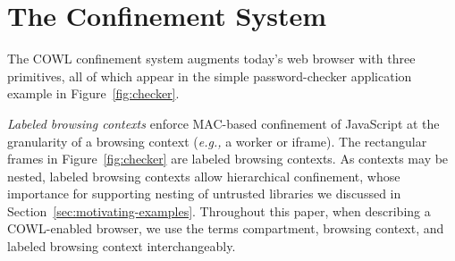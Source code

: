 \section{The \sys{} Confinement System}
\label{sec:system}

The COWL confinement system augments today's web browser with three
primitives, all of which appear in the simple password-checker
application example in Figure~\ref{fig:checker}.
%


%

{\em Labeled browsing contexts} enforce MAC-based confinement of
JavaScript at the granularity of a browsing context (\emph{e.g.,} a worker or
iframe). The rectangular frames in Figure~\ref{fig:checker} are
labeled browsing contexts. As contexts may be nested, labeled browsing
contexts allow hierarchical confinement, whose importance for
supporting nesting of untrusted libraries we discussed in
Section~\ref{sec:motivating-examples}. Throughout this paper, when
describing a COWL-enabled browser, we use the terms compartment,
browsing context, and labeled browsing context interchangeably.

